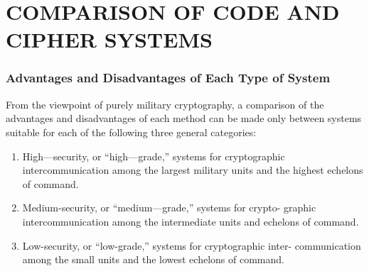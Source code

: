\chapter{COMPARISON OF CODE AND CIPHER SYSTEMS}
\subsection{Advantages and Disadvantages of Each Type of System}
\mypara From the viewpoint of purely military cryptography, a comparison
of the advantages and disadvantages of each method can be made only
between systems suitable for each of the following three general categories:
\begin{enumerate}
\item High—security, or “high—grade,” systems for cryptographic
intercommunication among the largest military units and the
highest echelons of command.

\item Medium-security, or “medium—grade,” systems for crypto-
graphic intercommunication among the intermediate units and
echelons of command.

\item Low-security, or “low-grade,” systems for cryptographic inter-
communication among the small units and the lowest echelons
of command.
\end{enumerate}

